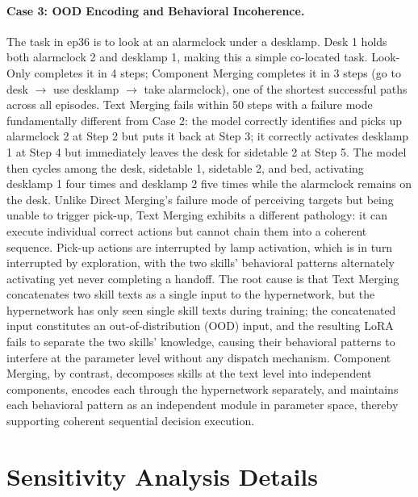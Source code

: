 \documentclass{llmxive}
\begin{document}
\paragraph{Case 3: OOD Encoding and Behavioral Incoherence.}
The task in ep36 is to look at an alarmclock under a desklamp. Desk 1 holds both alarmclock 2 and desklamp 1, making this a simple co-located task. Look-Only completes it in 4 steps; Component Merging completes it in 3 steps (go to desk $\rightarrow$ use desklamp $\rightarrow$ take alarmclock), one of the shortest successful paths across all episodes. Text Merging fails within 50 steps with a failure mode fundamentally different from Case 2: the model correctly identifies and picks up alarmclock 2 at Step 2 but puts it back at Step 3; it correctly activates desklamp 1 at Step 4 but immediately leaves the desk for sidetable 2 at Step 5. The model then cycles among the desk, sidetable 1, sidetable 2, and bed, activating desklamp 1 four times and desklamp 2 five times while the alarmclock remains on the desk. Unlike Direct Merging's failure mode of perceiving targets but being unable to trigger pick-up, Text Merging exhibits a different pathology: it can execute individual correct actions but cannot chain them into a coherent sequence. Pick-up actions are interrupted by lamp activation, which is in turn interrupted by exploration, with the two skills' behavioral patterns alternately activating yet never completing a handoff. The root cause is that Text Merging concatenates two skill texts as a single input to the hypernetwork, but the hypernetwork has only seen single skill texts during training; the concatenated input constitutes an out-of-distribution (OOD) input, and the resulting LoRA fails to separate the two skills' knowledge, causing their behavioral patterns to interfere at the parameter level without any dispatch mechanism. Component Merging, by contrast, decomposes skills at the text level into independent components, encodes each through the hypernetwork separately, and maintains each behavioral pattern as an independent module in parameter space, thereby supporting coherent sequential decision execution.

\section{Sensitivity Analysis Details}
\label{app:perturbation}
\end{document}
